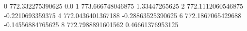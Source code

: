 0 772.332275390625 0.0
1 773.666748046875 1.33447265625
2 772.1112060546875 -0.2210693359375
4 772.0436401367188 -0.28863525390625
6 772.1867065429688 -0.14556884765625
8 772.7988891601562 0.46661376953125
